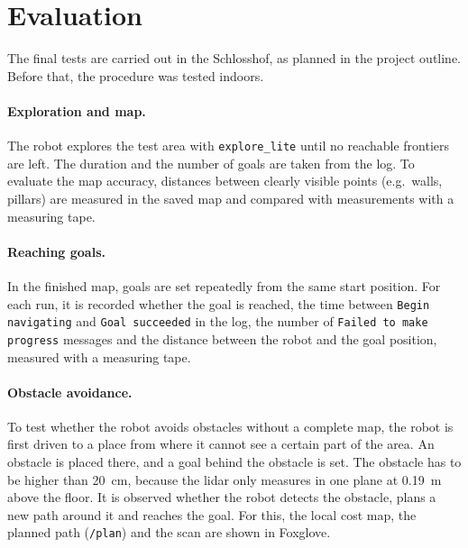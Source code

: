 \section{Evaluation}
\label{sec:evaluation_method}

The final tests are carried out in the Schlosshof, as planned in the project outline. Before that, the procedure was tested indoors. 

\paragraph{Exploration and map.} The robot explores the test area with \texttt{explore\_lite} until no reachable frontiers are left. The duration and the number of goals are taken from the log. To evaluate the map accuracy, distances between clearly visible points (e.g.\ walls, pillars) are measured in the saved map and compared with measurements with a measuring tape. 

\paragraph{Reaching goals.} In the finished map, goals are set repeatedly from the same start position. For each run, it is recorded whether the goal is reached, the time between \texttt{Begin navigating} and \texttt{Goal succeeded} in the log, the number of \texttt{Failed to make progress} messages and the distance between the robot and the goal position, measured with a measuring tape. 

\paragraph{Obstacle avoidance.} To test whether the robot avoids obstacles without a complete map, the robot is first driven to a place from where it cannot see a certain part of the area. An obstacle is placed there, and a goal behind the obstacle is set. The obstacle has to be higher than \SI{20}{\centi\metre}, because the lidar only measures in one plane at \SI{0.19}{\metre} above the floor. It is observed whether the robot detects the obstacle, plans a new path around it and reaches the goal. For this, the local cost map, the planned path (\texttt{/plan}) and the scan are shown in Foxglove. 
